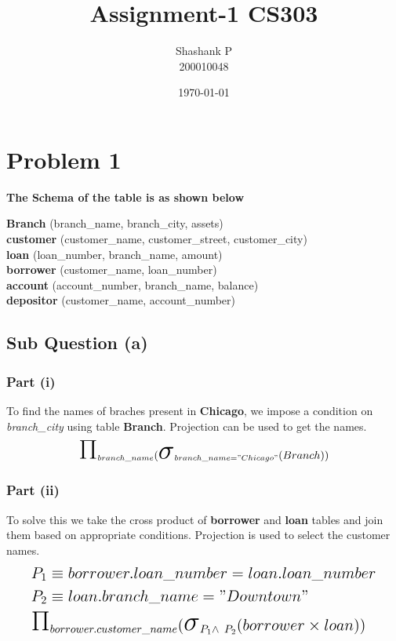 \documentclass{article}
\title{Assignment-1 CS303}
\author{Shashank P \\ 200010048}
\date{\today}
\newcommand{\bigsigma}{\makebox{\Huge\ensuremath{\sigma}}}
\newcommand{\bigpi}{\makebox{\Huge\ensuremath{\Pi}}}
\begin{document}
\maketitle




\section{Problem 1}
\textbf{The Schema of the table is as shown below}
\begin{center}
    \textbf{Branch} (branch\_name, branch\_city, assets) \\ 
    \textbf{customer} (customer\_name, customer\_street, customer\_city) \\ 
    \textbf{loan} (loan\_number, branch\_name, amount) \\ 
    \textbf{borrower} (customer\_name, loan\_number) \\ 
    \textbf{account} (account\_number, branch\_name, balance) \\ 
    \textbf{depositor} (customer\_name, account\_number) 
\end{center}


\subsection{Sub Question (a)}

\subsubsection{Part (i)}
\hspace{\parindent} To find the names of braches present in \textbf{Chicago}, we
impose a condition on \textit{branch\_city} using table \textbf{Branch}. Projection
can be used to get the names.
\begin{equation}
  \Large \bigpi_{branch\_name} (\bigsigma_{branch\_name = "Chicago"}(Branch))
\end{equation}

\subsubsection{Part (ii)}
\hspace{\parindent} To solve this we take the cross product of 
\textbf{borrower} and \textbf{loan} tables and join them based on
appropriate conditions. Projection is used to select the customer names.
\begin{equation}
  \Large 
    \begin{split}
       & P_1 \equiv  borrower.loan\_number = loan.loan\_number \\
       & P_2 \equiv  loan.branch\_name = "Downtown" \\
       & \bigpi_{borrower.customer\_name}  (\bigsigma_{P_1 \wedge \ P_2}(borrower \times loan))
    \end{split}
\end{equation}
 
\end{document}
